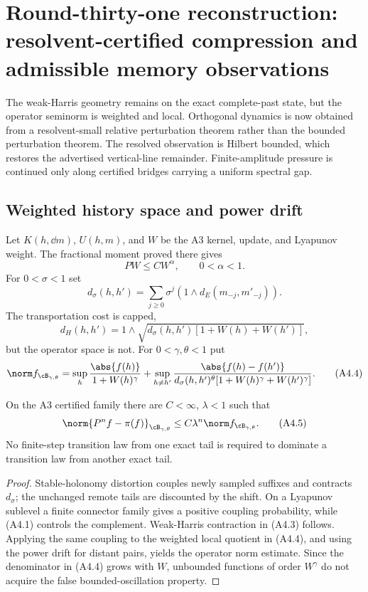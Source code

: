 \section{Round-thirty-one reconstruction: resolvent-certified compression and admissible memory observations}
\label{sec:r31-a4}

The weak-Harris geometry remains on the exact complete-past state, but the
operator seminorm is weighted and local.  Orthogonal dynamics is now obtained
from a resolvent-small relative perturbation theorem rather than the bounded
perturbation theorem.  The resolved observation is Hilbert bounded, which
restores the advertised vertical-line remainder.  Finite-amplitude pressure
is continued only along certified bridges carrying a uniform spectral gap.

\subsection{Weighted history space and power drift}

Let $K(h,\dd m)$, $U(h,m)$, and $W$ be the A3 kernel, update, and Lyapunov
weight.  The fractional moment proved there gives
\[
 PW\le C W^\alpha,\qquad0<\alpha<1.                       \tag{A4.1}
\]
For $0<\sigma<1$ set
\[
 d_\sigma(h,h')=\sum_{j\ge0}\sigma^j
   (1\wedge d_E(m_{-j},m'_{-j})).                         \tag{A4.2}
\]
The transportation cost is capped,
\[
 d_H(h,h')=1\wedge
 \sqrt{d_\sigma(h,h')[1+W(h)+W(h')]},                     \tag{A4.3}
\]
but the operator space is not.  For $0<\gamma,\theta<1$ put
\[
 \norm f_{\cB_{\gamma,\theta}}
 =\sup_h{\abs{f(h)}\over1+W(h)^\gamma}
 +\sup_{h\ne h'}{\abs{f(h)-f(h')}\over
 d_\sigma(h,h')^\theta[1+W(h)^\gamma+W(h')^\gamma]}.      \tag{A4.4}
\]

\begin{theorem}
\label{thm:r31-a4-harris}
On the A3 certified family there are $C<\infty$, $\lambda<1$ such that
\[
 \norm{P^nf-\pi(f)}_{\cB_{\gamma,\theta}}
 \le C\lambda^n\norm f_{\cB_{\gamma,\theta}}.             \tag{A4.5}
\]
No finite-step transition law from one exact tail is required to dominate a
transition law from another exact tail.
\end{theorem}

\begin{proof}
Stable-holonomy distortion couples newly sampled suffixes and contracts
$d_\sigma$; the unchanged remote tails are discounted by the shift.  On a
Lyapunov sublevel a finite connector family gives a positive coupling
probability, while (A4.1) controls the complement.  Weak-Harris contraction in
(A4.3) follows.  Applying the same coupling to the weighted local quotient in
(A4.4), and using the power drift for distant pairs, yields the operator norm
estimate.  Since the denominator in (A4.4) grows with $W$, unbounded functions
of order $W^\gamma$ do not acquire the false bounded-oscillation property.
\end{proof}

